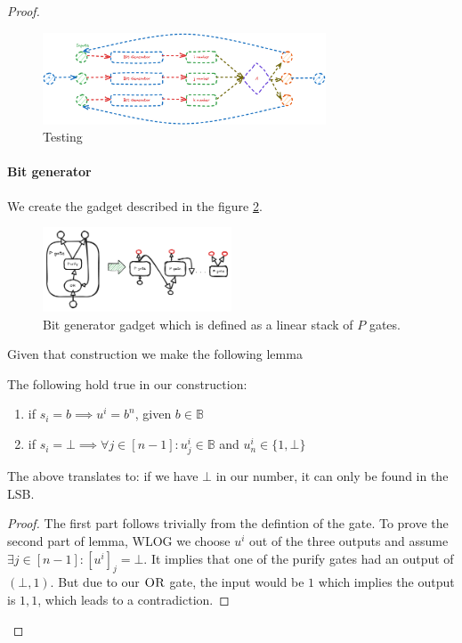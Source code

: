 \begin{proof}
\begin{figure}[h!]
    \centering
    \includegraphics[width=0.75\textwidth]{assets/reduction_sketch.png}
    \caption{Testing}
    \label{fig:main-proof:visualisation}
\end{figure}


\paragraph{Bit generator}

We create the gadget described in the figure \ref{fig:main-proof:purification}.

\begin{figure}[h!]
    \centering
    \includegraphics[width=0.5\textwidth, clip]{assets/purification_generator.png}
    \caption{Bit generator gadget which is defined as a linear stack of $P$ gates.} 
    \label{fig:main-proof:purification}
\end{figure}
\FloatBarrier

Given that construction we make the following lemma

\begin{lemma}
    \label{lem:bit-gen}
    The following hold true in our construction:
    \begin{enumerate}
        \item if $s_i = b \implies u^i = b^n$, given $b \in \mathbb{B}$
        \item if $s_i = \bot \implies \forall j \in [n-1]: u^i_j \in \mathbb{B}$ and $u^i_{n} \in \{1, \bot\}$
    \end{enumerate}
    The above translates to: if we have $\bot$ in our number, it can only be found in the LSB.
\end{lemma}

\begin{proof}
    The first part follows trivially from the defintion of the  gate.
    To prove the second part of lemma, WLOG we choose $u^i$ out of the three outputs and
    assume $\exists j \in [n-1]: [u^i]_j = \bot$. It implies  that one of the purify gates had an output of $(\bot, 1)$.
    But due to our $\textsc{OR}$ gate, the input would be $1$ which implies the output is $1,1$, which leads to a contradiction.
\end{proof}



\end{proof}
